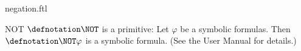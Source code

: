 \documentclass{stex}
\begin{document}
\begin{smodule}{negation.ftl}


\begin{documentation}{NOT}
  $\defnotation\NOT$ is a \Naproche primitive:
  Let $\varphi$ be a symbolic formulas.
  Then $\defnotation\NOT\varphi$ is a symbolic formula.
  (See the \Naproche User Manual for details.)
\end{documentation}

\end{smodule}
\end{document}
